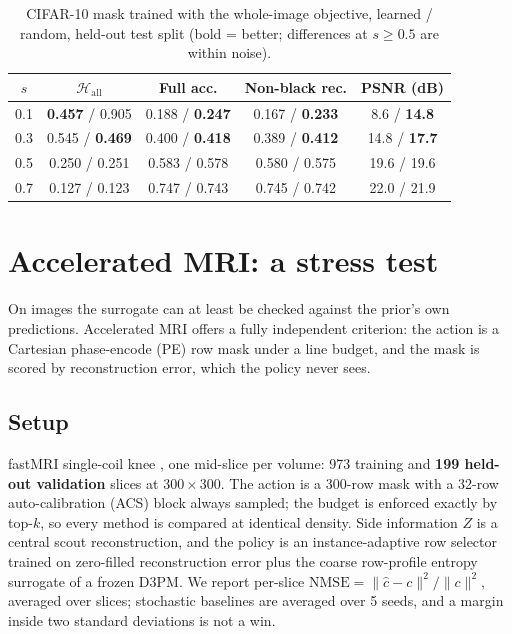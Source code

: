 \documentclass{article}
\begin{document}
\begin{table}[t]
\centering
\caption{CIFAR-10 mask trained with the whole-image objective, learned / random, held-out test split (bold = better; differences at $s \ge 0.5$ are within noise).}
\label{tab:cifar-new}
\small
\setlength{\tabcolsep}{3.5pt}
\begin{tabular}{ccccc}
\hline
$s$ & $\mathcal{H}_{\mathrm{all}}$ & Full acc. & Non-black rec. & PSNR (dB) \\
\hline
0.1 & \textbf{0.457} / 0.905 & 0.188 / \textbf{0.247} & 0.167 / \textbf{0.233} & 8.6 / \textbf{14.8} \\
0.3 & 0.545 / \textbf{0.469} & 0.400 / \textbf{0.418} & 0.389 / \textbf{0.412} & 14.8 / \textbf{17.7} \\
0.5 & 0.250 / 0.251 & 0.583 / 0.578 & 0.580 / 0.575 & 19.6 / 19.6 \\
0.7 & 0.127 / 0.123 & 0.747 / 0.743 & 0.745 / 0.742 & 22.0 / 21.9 \\
\hline
\end{tabular}
\end{table}

\section{Accelerated MRI: a stress test}

On images the surrogate can at least be checked against the prior's own predictions. Accelerated MRI offers a fully independent criterion: the action is a Cartesian phase-encode (PE) row mask under a line budget, and the mask is scored by reconstruction error, which the policy never sees.

\subsection{Setup}
fastMRI single-coil knee \citep{zbontar2018fastmri}, one mid-slice per volume: 973 training and \textbf{199 held-out validation} slices at $300 \times 300$. The action is a 300-row mask with a 32-row auto-calibration (ACS) block always sampled; the budget is enforced exactly by top-$k$, so every method is compared at identical density. Side information $Z$ is a central scout reconstruction, and the policy is an instance-adaptive row selector trained on zero-filled reconstruction error plus the coarse row-profile entropy surrogate of a frozen D3PM. We report per-slice $\mathrm{NMSE} = \lVert \hat{c} - c \rVert^2 / \lVert c \rVert^2$, averaged over slices; stochastic baselines are averaged over 5 seeds, and a margin inside two standard deviations is not a win.
\end{document}
